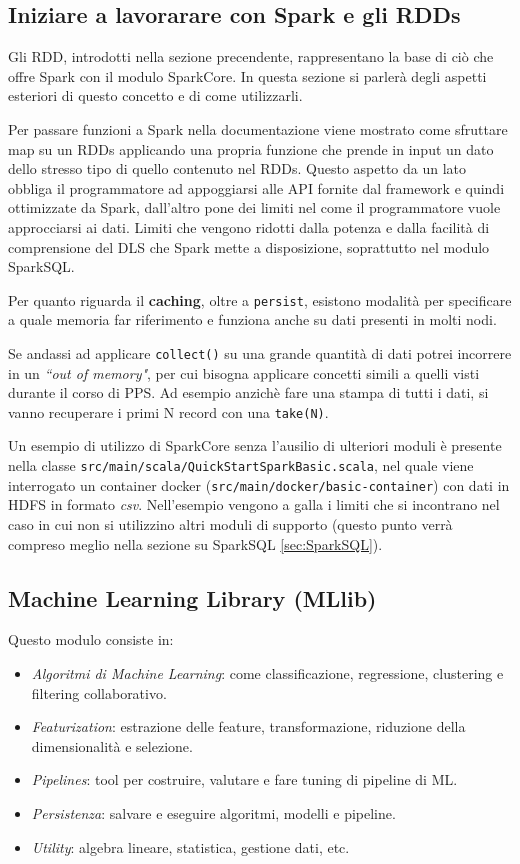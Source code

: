 \documentclass[12pt,italian]{article}
\begin{document}
\subsection{Iniziare a lavorarare con Spark e gli RDDs}
Gli RDD, introdotti nella sezione precendente, rappresentano la base di ciò che offre Spark con il modulo SparkCore. In questa sezione si parlerà degli aspetti esteriori di questo concetto e di come utilizzarli.
\par Per passare funzioni a Spark nella documentazione viene mostrato come sfruttare map su un RDDs applicando una propria funzione che prende in input un dato dello stresso tipo di quello contenuto nel RDDs. Questo aspetto da un lato obbliga il programmatore ad appoggiarsi alle API fornite dal framework e quindi ottimizzate da Spark, dall'altro pone dei limiti nel come il programmatore vuole approcciarsi ai dati. Limiti che vengono ridotti dalla potenza e dalla facilità di comprensione del DLS che Spark mette a disposizione, soprattutto nel modulo SparkSQL.
\par Per quanto riguarda il \textbf{caching}, oltre a \texttt{persist}, esistono modalità per specificare a quale memoria far riferimento e funziona anche su dati presenti in molti nodi.
\par Se andassi ad applicare \texttt{collect()} su una grande quantità di dati potrei incorrere in un \textit{``out of memory"}, per cui bisogna applicare concetti simili a quelli visti durante il corso di PPS. Ad esempio anzichè fare una stampa di tutti i dati, si vanno recuperare i primi N record con una \texttt{take(N)}.
\par Un esempio di utilizzo di SparkCore senza l'ausilio di ulteriori moduli è presente nella classe \texttt{src/main/scala/QuickStartSparkBasic.scala}, nel quale viene interrogato un container docker (\texttt{src/main/docker/basic-container})  con dati in HDFS in formato \textit{csv}. Nell'esempio vengono a galla i limiti che si incontrano nel caso in cui non si utilizzino altri moduli di supporto (questo punto verrà compreso meglio nella sezione su SparkSQL \ref{sec:SparkSQL}).
\subsection{Machine Learning Library (MLlib)}
Questo modulo consiste in:
\begin{itemize}
	\item \textit{Algoritmi di Machine Learning}: come classificazione, regressione, clustering e filtering collaborativo.
	\item \textit{Featurization}: estrazione delle feature, transformazione, riduzione della dimensionalità e selezione.
	\item \textit{Pipelines}: tool per costruire, valutare e fare tuning di pipeline di ML.
	\item \textit{Persistenza}: salvare e eseguire algoritmi, modelli e pipeline.
	\item \textit{Utility}: algebra lineare, statistica, gestione dati, etc.
\end{itemize}
\end{document}
